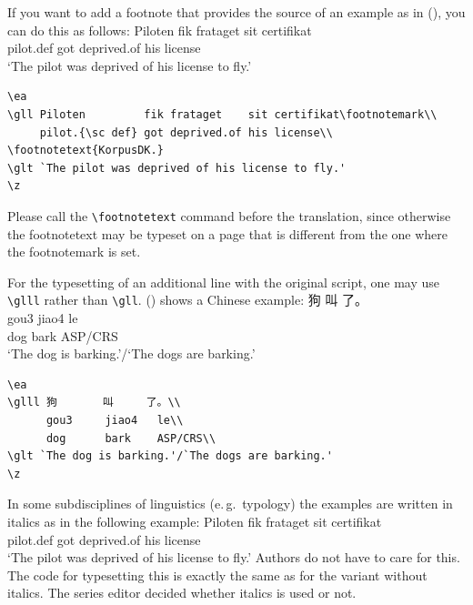 If you want to add a footnote that provides the source of an example as in (), you can do
this as follows:
\ea
\gll Piloten         fik frataget    sit certifikat\footnotemark\\
     pilot.{\sc def} got deprived.of his license\\
\glt `The pilot was deprived of his license to fly.'
\z 
\begin{verbatim}
\ea
\gll Piloten         fik frataget    sit certifikat\footnotemark\\
     pilot.{\sc def} got deprived.of his license\\
\footnotetext{KorpusDK.}
\glt `The pilot was deprived of his license to fly.'
\z 
\end{verbatim}
Please call the \verb+\footnotetext+ command before the translation, since otherwise the
footnotetext may be typeset on a page that is different from the one where the footnotemark is set.

For the typesetting of an additional line with the original script, one may use \verb+\glll+ rather
than \verb+\gll+. () shows a Chinese example:
\ea
\label{ex-chinese}
\glll 狗       叫     了。\\
      gou3     jiao4   le\\
      dog      bark    ASP/CRS\\
\glt `The dog is barking.'/`The dogs are barking.'
\z

\begin{verbatim}
\ea
\glll 狗       叫     了。\\
      gou3     jiao4   le\\
      dog      bark    ASP/CRS\\
\glt `The dog is barking.'/`The dogs are barking.'
\z
\end{verbatim}


In some subdisciplines of linguistics (e.\,g.\ typology) the examples are written in italics as in the
following example:
\ea
\def\exfont{\normalsize\it}
\gll Piloten         fik frataget    sit certifikat\footnotemark\\
     pilot.{\sc def} got deprived.of his license\\
\glt `The pilot was deprived of his license to fly.'
\z 
Authors do not have to care for this. The code for typesetting this is exactly the same as for the
variant without italics.
The series editor decided whether italics is used or not.


